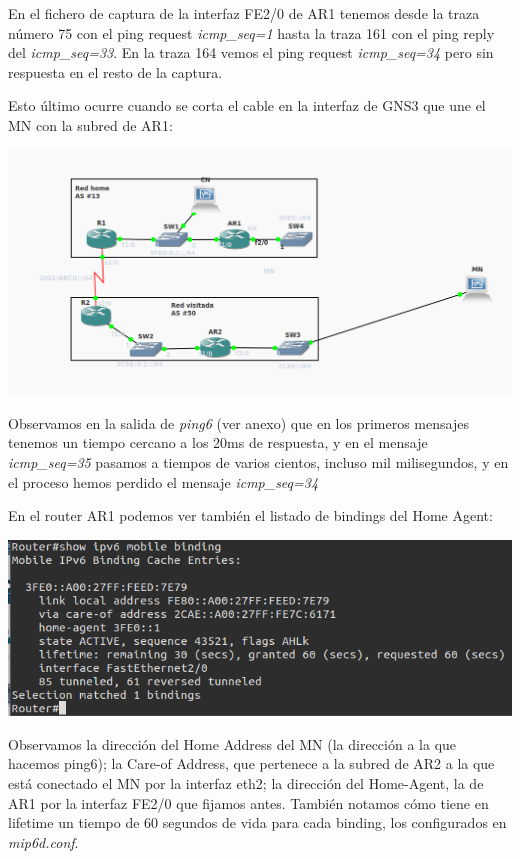 \documentclass{article}
\begin{document}
En el fichero de captura de la interfaz FE2/0 de AR1 tenemos desde la traza número 75 con el ping request \textit{icmp\_seq=1} hasta la traza 161 con el ping reply del \textit{icmp\_seq=33}. En la traza 164 vemos el ping request \textit{icmp\_seq=34} pero sin respuesta en el resto de la captura.

Esto último ocurre cuando se corta el cable en la interfaz de GNS3 que une el MN con la subred de AR1:

\begin{center}
	\includegraphics[scale=0.4]{images/topdesc.png}
\end{center}

Observamos en la salida de \textit{ping6} (ver anexo) que en los primeros mensajes tenemos un tiempo cercano a los 20ms de respuesta, y en el mensaje \textit{icmp\_seq=35} pasamos a tiempos de varios cientos, incluso mil milisegundos, y en el proceso hemos perdido el mensaje \textit{icmp\_seq=34}

En el router AR1 podemos ver también el listado de bindings del Home Agent:

\begin{center}
	\includegraphics[scale=0.6]{images/ar1binding.png}
\end{center}

Observamos la dirección del Home Address del MN (la dirección a la que hacemos ping6); la Care-of Address, que pertenece a la subred de AR2 a la que está conectado el MN por la interfaz eth2; la dirección del Home-Agent, la de AR1 por la interfaz FE2/0 que fijamos antes. También notamos cómo tiene en lifetime un tiempo de 60 segundos de vida para cada binding, los configurados en \textit{mip6d.conf}.
\end{document}
